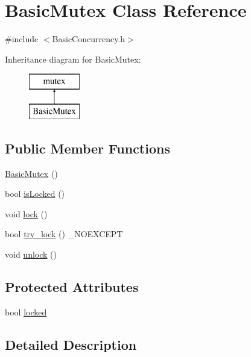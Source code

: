 \hypertarget{class_basic_mutex}{\section{Basic\-Mutex Class Reference}
\label{class_basic_mutex}
}


{\ttfamily \#include $<$Basic\-Concurrency.\-h$>$}

Inheritance diagram for Basic\-Mutex\-:\begin{figure}[H]
\begin{center}
\leavevmode
\includegraphics[height=2.000000cm]{class_basic_mutex}
\end{center}
\end{figure}
\subsection*{Public Member Functions}
\begin{DoxyCompactItemize}
\item 
\hyperlink{class_basic_mutex_aa578b7d25350cfdacf2245ac48f6c9a9}{Basic\-Mutex} ()
\item 
bool \hyperlink{class_basic_mutex_ad092a0e0ec88f115f29a6094b5e6c446}{is\-Locked} ()
\item 
void \hyperlink{class_basic_mutex_aa7a702cf99a4de227661cfb8604f2996}{lock} ()
\item 
bool \hyperlink{class_basic_mutex_a10ea86bf3ed7dc5b5e7fd98b456186ca}{try\-\_\-lock} () \-\_\-\-N\-O\-E\-X\-C\-E\-P\-T
\item 
void \hyperlink{class_basic_mutex_a2f14a0ea0347d8e1dd450301db0d4c34}{unlock} ()
\end{DoxyCompactItemize}
\subsection*{Protected Attributes}
\begin{DoxyCompactItemize}
\item 
bool \hyperlink{class_basic_mutex_a311753410a2191a3c6d5383698242ae9}{locked}
\end{DoxyCompactItemize}


\subsection{Detailed Description}


